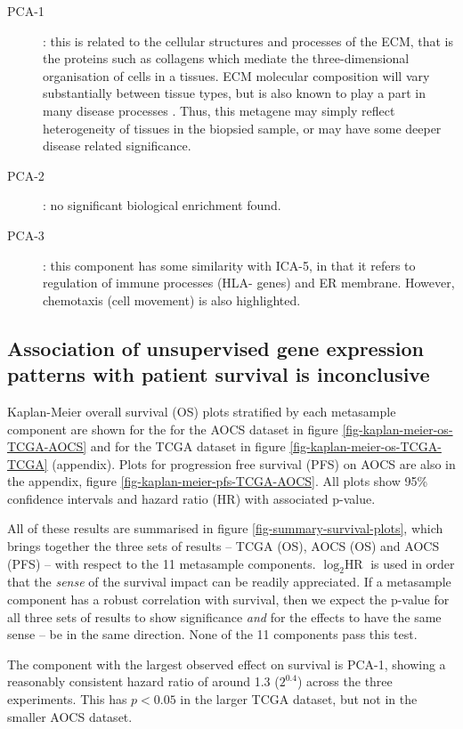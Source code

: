 \documentclass[tikz, 12pt,a4paper,oneside,fleqn]{article}
\begin{document}
\begin{description}
%
\item[PCA-1]: this is related to the cellular structures and processes of the ECM, that is the proteins such as collagens which mediate the three-dimensional organisation of cells in a tissues.  ECM molecular composition will vary substantially between tissue types, but is also known to play a part in many disease processes \cite{Theocharis2019}.  Thus, this metagene may simply reflect heterogeneity of tissues in the biopsied sample, or may have some deeper disease related significance.
%
\item[PCA-2]: no significant biological enrichment found.
%
\item[PCA-3]: this component has some similarity with ICA-5, in that it refers to regulation of immune processes (HLA- genes) and ER membrane.   However, chemotaxis (cell movement) is also highlighted.
\end{description}


\FloatBarrier

\subsection{Association of unsupervised gene expression patterns with patient survival is inconclusive}

Kaplan-Meier overall survival (OS) plots stratified by each metasample component are shown for the for the AOCS dataset in figure \ref{fig-kaplan-meier-os-TCGA-AOCS} and for the TCGA dataset in figure \ref{fig-kaplan-meier-os-TCGA-TCGA} (appendix).  Plots for progression free survival (PFS) on AOCS are also in the appendix, figure \ref{fig-kaplan-meier-pfs-TCGA-AOCS}.   All plots show 95\% confidence intervals and hazard ratio (HR) with associated p-value.

All of these results are summarised in figure \ref{fig-summary-survival-plots}, which brings together the three sets of results -- TCGA (OS), AOCS (OS) and AOCS (PFS) --  with respect to the 11 metasample components.  $\log_2{\mbox{HR}}$ is used in order that the \emph{sense} of the survival impact can be readily appreciated.    If a metasample component has a robust correlation with survival, then we expect the p-value for all three sets of results to show significance \emph{and} for the effects to have the same sense -- be in the same direction.  None of the 11 components pass this test.   

The component with the largest observed effect on survival is PCA-1, showing a reasonably consistent hazard ratio of around 1.3 ($2^{0.4}$) across the three experiments.  This has $p < 0.05$ in the larger TCGA dataset, but not in the smaller AOCS dataset.
\end{document}
